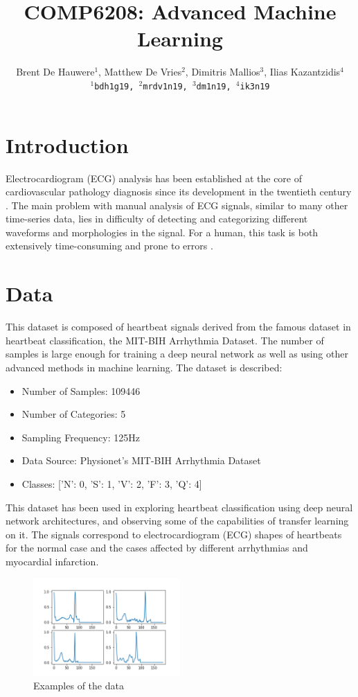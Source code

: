 \documentclass[11pt]{article}
\title{COMP6208: Advanced Machine Learning}
\author{
  Brent De Hauwere$^1$, Matthew De Vries$^2$, Dimitris Mallios$^3$, Ilias Kazantzidis$^4$ \\
  \texttt{$^1$bdh1g19, $^2$mrdv1n19, $^3$dm1n19, $^4$ik3n19}
}
\begin{document}
\maketitle

\vspace{-1.2cm}
\section{Introduction}
Electrocardiogram (ECG) analysis has been established at the core of cardiovascular pathology diagnosis since its development in the twentieth century \cite{alfras}. The main problem with manual analysis of ECG signals, similar to many other time-series data, lies in difficulty of detecting and categorizing different waveforms and morphologies in the signal. For a human, this task is both extensively time-consuming and prone to errors \cite{Kachuee_2018}. 

\vspace{-0.3cm}

\section{Data}
This dataset is composed of heartbeat signals derived from the famous dataset in heartbeat classification, the MIT-BIH Arrhythmia Dataset. The number of samples is large enough for training a deep neural network as well as using other advanced methods in machine learning. The dataset is described:
\begin{itemize}
    \item Number of Samples: 109446
    \item Number of Categories: 5
    \item Sampling Frequency: 125Hz
    \item Data Source: Physionet's MIT-BIH Arrhythmia Dataset
    \item Classes: ['N': 0, 'S': 1, 'V': 2, 'F': 3, 'Q': 4]
\end{itemize}

This dataset has been used in exploring heartbeat classification using deep neural network architectures, and observing some of the capabilities of transfer learning on it. The signals correspond to electrocardiogram (ECG) shapes of heartbeats for the normal case and the cases affected by different arrhythmias and myocardial infarction. 

\begin{figure}[h]
    \centering
    \includegraphics[width=0.5\textwidth]{images/heartbeats.png}
    \caption{Examples of the data}
    \label{fig:examples}
\end{figure}
\end{document}
